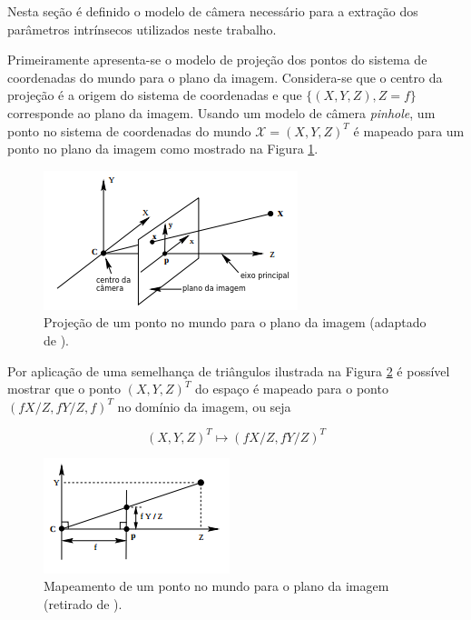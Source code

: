 {Nesta seção é definido o modelo de câmera necessário para a extração dos parâmetros intrínsecos utilizados neste trabalho. 

Primeiramente apresenta-se o modelo de projeção dos pontos do sistema de coordenadas do mundo para o plano da imagem. Considera-se que o centro da projeção é a origem do sistema de coordenadas e que $\{(X,Y,Z), Z = f\}$ corresponde ao plano da imagem. Usando um modelo de câmera \textit{pinhole}, um ponto no sistema de coordenadas do mundo $\mathcal{X} = (X,Y,Z)^T$ é mapeado para um ponto no plano da imagem como mostrado na Figura \ref{fig:projeção}.

\begin{figure}[h!]
\centering
\includegraphics[width=.5\linewidth]{figs/TG_pinhole_1_pt.png}
\caption{Projeção de um ponto no mundo para o plano da imagem (adaptado de \cite{hartley2003multiple}).}
\label{fig:projeção}
\end{figure}

Por aplicação de uma semelhança de triângulos ilustrada na Figura \ref{fig:mapeamento} é possível mostrar que o ponto $(X,Y,Z)^T$ do espaço é mapeado para o ponto $(fX/Z,fY/Z,f)^T$ no domínio da imagem, ou seja

\begin{equation}
(X,Y,Z)^T \mapsto (fX/Z,fY/Z)^T
\label{eq:3d_mapPonto}
\end{equation}


\begin{figure}[h!]
\centering
\includegraphics[width=.5\linewidth]{figs/TG_pinhole_2.png}
\caption{Mapeamento de um ponto no mundo para o plano da imagem (retirado de \cite{hartley2003multiple}).}
\label{fig:mapeamento}
\end{figure}

}
